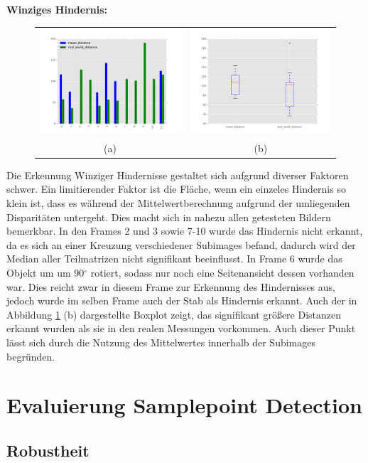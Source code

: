 	\noindent
	\textbf{Winziges Hindernis:}\\
	\begin{figure}[h]
		\centering
		\begin{tabular}{cc}
		\includegraphics[width=7cm]{img/evaluation/tiny_bar}&
		\includegraphics[width=7cm]{img/evaluation/tiny_box}\\
		(a)	& (b)
		\end{tabular}
	    \caption{}
	    \label{fig:eval_tiny}
	\end{figure}
	
	Die Erkennung Winziger Hindernisse gestaltet sich aufgrund diverser Faktoren schwer. Ein limitierender Faktor ist die Fläche, wenn ein einzeles Hindernis so klein ist, dass es während der Mittelwertberechnung aufgrund der umliegenden Disparitäten untergeht. Dies macht sich in nahezu allen getesteten Bildern bemerkbar. In den Frames 2 und 3 sowie 7-10 wurde das Hindernis nicht erkannt, da es sich an einer Kreuzung verschiedener Subimages befand, dadurch wird der Median aller Teilmatrizen nicht signifikant beeinflusst. In Frame 6 wurde das Objekt um um 90$^{\circ}$ rotiert, sodass nur noch eine Seitenansicht dessen vorhanden war. Dies reicht zwar in diesem Frame zur Erkennung des Hindernisses aus, jedoch wurde im selben Frame auch der Stab als Hindernis erkannt. Auch der in Abbildung \ref{fig:eval_tiny} (b) dargestellte Boxplot zeigt, das signifikant größere Distanzen erkannt wurden als sie in den realen Messungen vorkommen. Auch dieser Punkt lässt sich durch die Nutzung des Mittelwertes innerhalb der Subimages begründen.

\section{Evaluierung Samplepoint Detection}
\label{sec:evaluierung_samplepoint}

    \subsection{Robustheit}
    \label{subsec:samplepoint_robustheit}    
